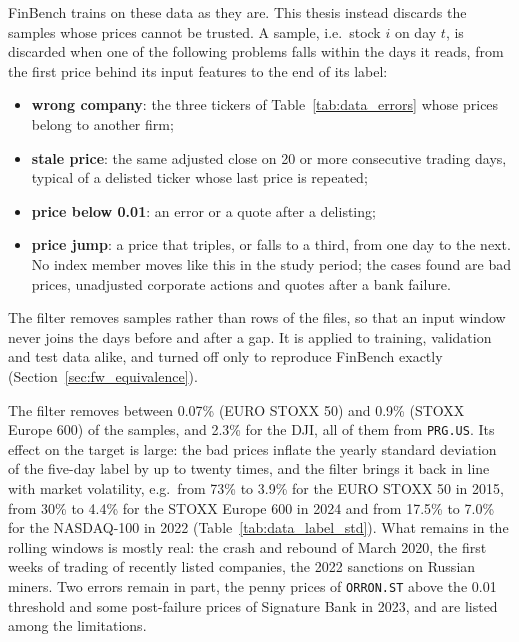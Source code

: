 FinBench trains on these data as they are. This thesis instead discards the samples whose prices cannot be trusted. A sample, i.e.\ stock $i$ on day $t$, is discarded when one of the following problems falls within the days it reads, from the first price behind its input features to the end of its label:
\begin{itemize}[noitemsep]
    \item \textbf{wrong company}: the three tickers of Table~\ref{tab:data_errors} whose prices belong to another firm;
    \item \textbf{stale price}: the same adjusted close on 20 or more consecutive trading days, typical of a delisted ticker whose last price is repeated;
    \item \textbf{price below 0.01}: an error or a quote after a delisting;
    \item \textbf{price jump}: a price that triples, or falls to a third, from one day to the next. No index member moves like this in the study period; the cases found are bad prices, unadjusted corporate actions and quotes after a bank failure.
\end{itemize}
The filter removes samples rather than rows of the files, so that an input window never joins the days before and after a gap. It is applied to training, validation and test data alike, and turned off only to reproduce FinBench exactly (Section~\ref{sec:fw_equivalence}).

The filter removes between 0.07\% (EURO STOXX 50) and 0.9\% (STOXX Europe 600) of the samples, and 2.3\% for the DJI, all of them from \texttt{PRG.US}. Its effect on the target is large: the bad prices inflate the yearly standard deviation of the five-day label by up to twenty times, and the filter brings it back in line with market volatility, e.g.\ from 73\% to 3.9\% for the EURO STOXX 50 in 2015, from 30\% to 4.4\% for the STOXX Europe 600 in 2024 and from 17.5\% to 7.0\% for the NASDAQ-100 in 2022 (Table~\ref{tab:data_label_std}). What remains in the rolling windows is mostly real: the crash and rebound of March 2020, the first weeks of trading of recently listed companies, the 2022 sanctions on Russian miners. Two errors remain in part, the penny prices of \texttt{ORRON.ST} above the 0.01 threshold and some post-failure prices of Signature Bank in 2023, and are listed among the limitations.



